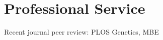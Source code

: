 \documentclass[letterpaper]{article}
\renewenvironment{itemize}{
  \begin{list}{}{
    \setlength{\leftmargin}{1.5em}
  }
}{
  \end{list}
}
\begin{document}
\section*{Professional Service}
\begin{itemize}

\item Recent journal peer review: PLOS Genetics, MBE

\end{itemize}

\end{document}
